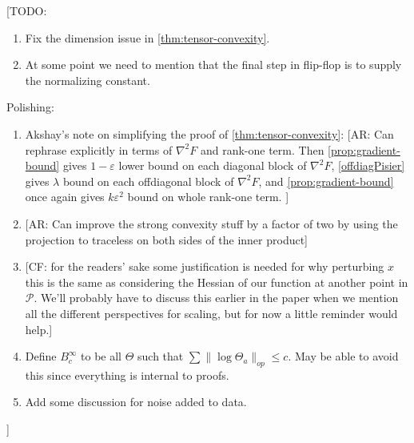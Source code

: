 \documentclass[aos]{imsart}
\theoremstyle{definition}
\numberwithin{equation}{section}
\newcommand{\eps}{\varepsilon}
\newcommand{\SPD}{\mathcal{P}}
\newcommand{\samp}{x}
\newcommand{\CF}[1]{{\color{purple}[CF: #1]}}
\newcommand{\AR}[1]{{\color{orange}[AR: #1]}}
\newcommand{\TODO}[1]{{\color{blue}[TODO: #1]}}
\begin{document}
\tableofcontents

\TODO{
\begin{enumerate}
\item Fix the dimension issue in \cref{thm:tensor-convexity}.
\item At some point we need to mention that the final step in flip-flop is to supply the normalizing constant.
\end{enumerate}
Polishing:
\begin{enumerate}
\item Akshay's note on simplifying the proof of \cref{thm:tensor-convexity}: \AR{Can rephrase explicitly in terms of $\nabla^{2} F$ and rank-one term. Then \cref{prop:gradient-bound} gives $1-\eps$ lower bound on each diagonal block of $\nabla^{2} F$, \cref{offdiagPisier} gives $\lambda$ bound on each offdiagonal block of $\nabla^{2} F$, and \cref{prop:gradient-bound} once again gives $k \eps^{2}$ bound on whole rank-one term.  }
\item \AR{Can improve the strong convexity stuff by a factor of two by using the projection to traceless on both sides of the inner product}
\item \CF{for the readers' sake some justification is needed for why perturbing $\samp$ this is the same as considering the Hessian of our function at another point in $\SPD$. We'll probably have to discuss this earlier in the paper when we mention all the different perspectives for scaling, but for now a little reminder would help.}
\item Define $B^\infty_c$ to be all $\Theta$ such that $\sum \|\log \Theta_a\|_{op} \leq c$. May be able to avoid this since everything is internal to proofs.
\item Add some discussion for noise added to data.
\end{enumerate}
}


\end{document}
